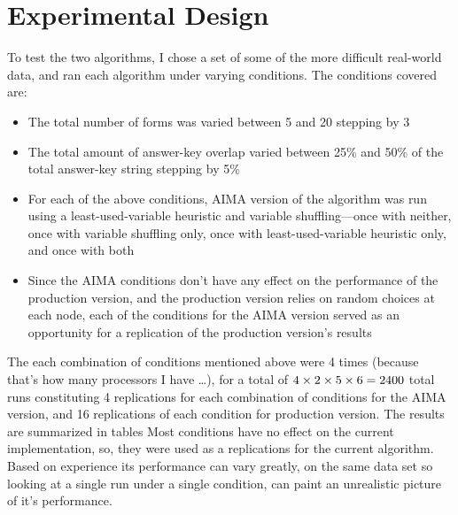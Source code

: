 \documentclass[11pt]{article}
\begin{document}
\section{Experimental Design}
To test the two algorithms, I chose a set of some of the more
difficult real-world data, and ran each algorithm under varying
conditions.  The conditions covered are:
\begin{itemize}
\item The total number of forms was varied between 5 and 20 stepping
  by 3
\item The total amount of answer-key overlap varied between 25\% and
  50\% of the total answer-key string stepping by 5\%
\item For each of the above conditions, AIMA version of the algorithm
  was run using a least-used-variable heuristic and variable
  shuffling---once with neither, once with variable shuffling only,
  once with least-used-variable heuristic only, and once with both
\item Since the AIMA conditions don't have any effect on the
  performance of the production version, and the production version
  relies on random choices at each node, each of the conditions for
  the AIMA version served as an opportunity for a replication of the
  production version's results
\end{itemize}
The each combination of conditions mentioned above were 4 times
(because that's how many processors I have \dots), for a total of
\(4 \time 2 \times 2 \times 5 \times 6 = 2400 \)
total runs constituting 4 replications for each combination of
conditions for the AIMA version, and 16 replications of each condition
for production version. The results are summarized in tables Most
conditions have no effect on the current implementation, so, they were
used as a replications for the current algorithm.  Based on experience
its performance can vary greatly, on the same data set so looking at a
single run under a single condition, can paint an unrealistic picture
of it's performance.
\par
\end{document}
